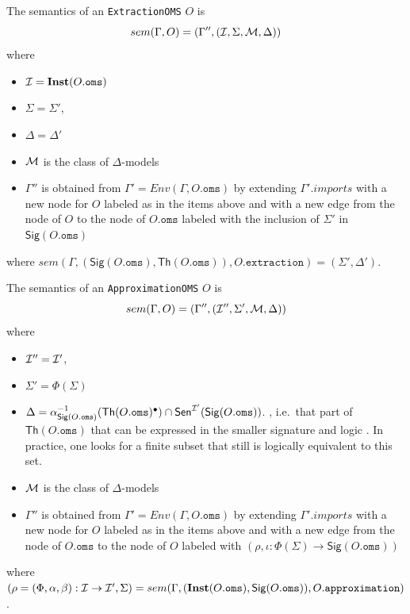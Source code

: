 \documentclass[10pt, a4paper]{isov2}
\newcommand*{\syntax}[1]{\texttt{#1}}
\newcommand{\Sig}{\mathsf{Sig}}
\renewcommand{\Th}{\mathsf{Th}}
\newcommand{\Inst}{\ensuremath{\mathbf{Inst}}}
\begin{document}
The semantics of an \syntax{ExtractionOMS} $O$
is
$$sem(\Gamma, O) = (\Gamma'',({\cal I},\Sigma,{\cal M},\Delta))$$
\noindent where
\begin{itemize}
  \item $\cI = \Inst(O.\syntax{oms})$
  \item $\Sigma = \Sigma'$,
  \item $\Delta = \Delta'$
  \item ${\cal M}$ is the class of $\Delta$-models
  \item $\Gamma''$ is obtained from 
       $\Gamma' = Env(\Gamma, O.\syntax{oms})$
       by extending $\Gamma'.imports$
        with a new node for $O$ labeled as in the items above
        and with a new edge from the node of $O$ to the node of 
        $O.\syntax{oms}$ labeled with
        the inclusion of $\Sigma'$ in $\Sig(O.\syntax{oms})$
\end{itemize}
where 
$sem(\Gamma, (\Sig(O.\syntax{oms}), \Th(O.\syntax{oms})), O.\syntax{extraction}) = 
(\Sigma',\Delta')$.

The semantics of an \syntax{ApproximationOMS} $O$ is
$$sem(\Gamma, O) = (\Gamma'',({\cal I}'',\Sigma',{\cal M},\Delta))$$
\noindent where
\begin{itemize}
  \item ${\cal I}'' = {\cal I}'$,
  \item $\Sigma' = \Phi(\Sigma)$
  \item $\Delta = \alpha^{-1}_{\Sig(O.\syntax{oms})}(\Th(O.\syntax{oms})^\bullet)\cap\Sen^{\cI'}(\Sig(O.\syntax{oms}))$.
, i.e.\ that part of $\Th(O.\syntax{oms})$ that can be expressed in the smaller signature and logic . In  practice, one looks for a finite subset that still is logically equivalent to this set.
  \item ${\cal M}$ is the class of $\Delta$-models
  \item $\Gamma''$ is obtained from 
       $\Gamma' = Env(\Gamma, O.\syntax{oms})$
       by extending $\Gamma'.imports$
        with a new node for $O$ labeled as in the items above
        and with a new edge from the node of $O.\syntax{oms}$ to the node of $O$ 
        labeled with $(\rho,\iota: \Phi(\Sigma) \to \Sig(O.\syntax{oms}))$ 
\end{itemize}
\noindent where $(\rho = (\Phi,\alpha,\beta):\cI\to\cI',\Sigma) = sem(\Gamma, (\Inst(O.\syntax{oms}), \Sig(O.\syntax{oms})), O.\syntax{approximation})$.
\end{document}
